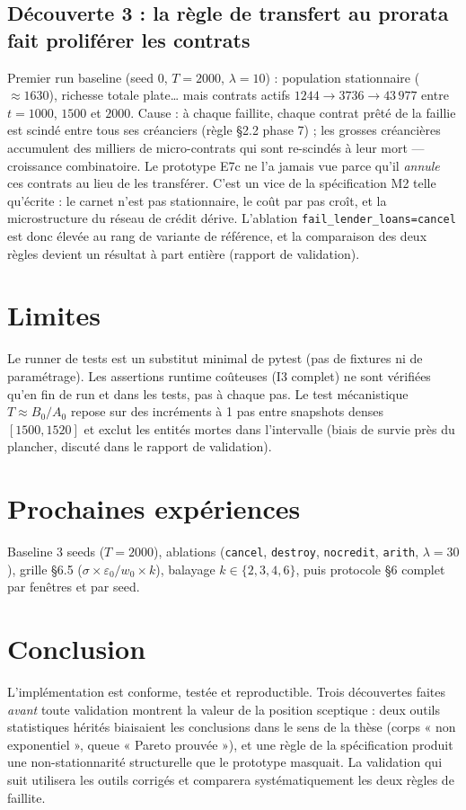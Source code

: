 \documentclass[11pt,a4paper]{article}
\newcommand{\code}[1]{\texttt{#1}}
\begin{document}
\subsection{Découverte 3 : la règle de transfert au prorata fait proliférer
les contrats}
Premier run baseline (seed 0, $T=2000$, $\lambda=10$) : population
stationnaire ($\approx 1630$), richesse totale plate… mais contrats actifs
$1244 \to 3736 \to 43\,977$ entre $t=1000$, $1500$ et $2000$. Cause : à
chaque faillite, chaque contrat prêté de la faillie est scindé entre tous
ses créanciers (règle §2.2 phase 7) ; les grosses créancières accumulent des
milliers de micro-contrats qui sont re-scindés à leur mort — croissance
combinatoire. Le prototype E7c ne l'a jamais vue parce qu'il \emph{annule}
ces contrats au lieu de les transférer. C'est un vice de la spécification
M2 telle qu'écrite : le carnet n'est pas stationnaire, le coût par pas croît,
et la microstructure du réseau de crédit dérive. L'ablation
\code{fail\_lender\_loans=cancel} est donc élevée au rang de variante de
référence, et la comparaison des deux règles devient un résultat à part
entière (rapport de validation).

\section{Limites}
Le runner de tests est un substitut minimal de pytest (pas de fixtures ni de
paramétrage). Les assertions runtime coûteuses (I3 complet) ne sont
vérifiées qu'en fin de run et dans les tests, pas à chaque pas. Le test
mécanistique $T \approx B_0/A_0$ repose sur des incréments à 1 pas entre
snapshots denses $[1500, 1520]$ et exclut les entités mortes dans
l'intervalle (biais de survie près du plancher, discuté dans le rapport de
validation).

\section{Prochaines expériences}
Baseline 3 seeds ($T=2000$), ablations (\code{cancel}, \code{destroy},
\code{nocredit}, \code{arith}, $\lambda=30$), grille §6.5
($\sigma \times \varepsilon_0/w_0 \times k$), balayage $k \in \{2,3,4,6\}$,
puis protocole §6 complet par fenêtres et par seed.

\section{Conclusion}
L'implémentation est conforme, testée et reproductible. Trois découvertes
faites \emph{avant} toute validation montrent la valeur de la position
sceptique : deux outils statistiques hérités biaisaient les conclusions dans
le sens de la thèse (corps « non exponentiel », queue « Pareto prouvée »),
et une règle de la spécification produit une non-stationnarité structurelle
que le prototype masquait. La validation qui suit utilisera les outils
corrigés et comparera systématiquement les deux règles de faillite.
\end{document}
